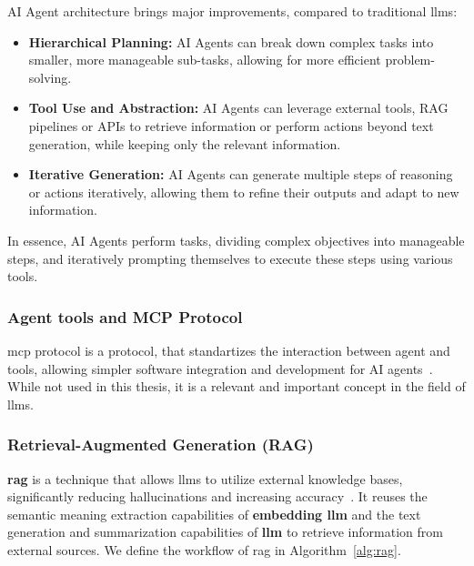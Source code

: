 AI Agent architecture brings major improvements, compared to traditional
\glspl{llm}:
\begin{itemize}
  \item \textbf{Hierarchical Planning:} AI Agents can break down complex tasks into
    smaller, more manageable sub-tasks, allowing for more efficient problem-solving.
  \item \textbf{Tool Use and Abstraction:} AI Agents can leverage external tools,
    RAG pipelines or APIs to retrieve information or perform actions
    beyond text generation, while keeping only the relevant information.
  \item \textbf{Iterative Generation:} AI Agents can generate multiple steps of
    reasoning or actions iteratively, allowing them to refine their outputs
    and adapt to new information.
\end{itemize}
In essence, AI Agents perform tasks, dividing complex objectives into
manageable steps, and iteratively prompting themselves to execute
these steps using various tools.


\subsubsection{Agent tools and MCP Protocol}

\gls{mcp} protocol is a protocol, that standartizes the interaction between
agent and tools, allowing simpler software integration and development for AI
agents~\cite{anthropic2024mcp}. While not used in this thesis, it is a relevant
and important concept in the field of \glspl{llm}.


\subsubsection{Retrieval-Augmented Generation (RAG)}

\textbf{\gls{rag}} is a technique that allows \glspl{llm} to utilize external
knowledge bases, significantly reducing hallucinations and increasing
accuracy~\cite{zhao2023}. It reuses the semantic meaning extraction capabilities
of \textbf{embedding \gls{llm}} and the text generation and summarization
capabilities of \textbf{\gls{llm}} to retrieve information from external
sources. We define the workflow of \gls{rag} in Algorithm~\ref{alg:rag}.


